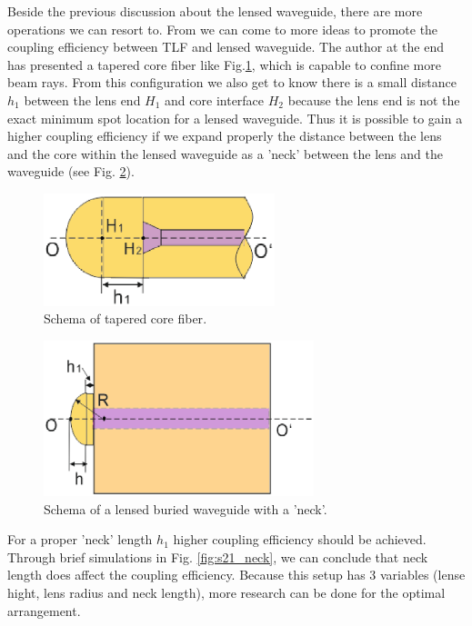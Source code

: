 Beside the previous discussion about the lensed waveguide, there are more operations we can resort to. From \cite{integrated_coupling_between_LD_SMF} we can come to more ideas to promote the coupling efficiency between TLF and lensed waveguide. The author at the end has presented a tapered core fiber like Fig.\ref{fig:tapered_core_fiber}, which is capable to confine more beam rays. From this configuration we also get to know there is a small distance $h_{1}$ between the lens end $H_{1}$ and core interface $H_{2}$ because the lens end is not the exact minimum spot location for a lensed waveguide. Thus it is possible to gain a higher coupling efficiency if we expand properly the distance between the lens and the core within the lensed waveguide as a 'neck' between the lens and the waveguide (see Fig. \ref{fig:lensed_waveguide_neck}).\\ 

\begin{figure}[!ht]
\centering
\includegraphics[width=0.6\textwidth]{bilder/tapered_core_fiber}
\caption {Schema of tapered core fiber\cite{integrated_coupling_between_LD_SMF}.}
\label{fig:tapered_core_fiber}
\end{figure}
\begin{figure}[!ht]
\centering
\includegraphics[width=0.7\textwidth]{bilder/lensed_waveguide_neck}
\caption {Schema of a lensed buried waveguide with a 'neck'.}
\label{fig:lensed_waveguide_neck}
\end{figure}
For a proper 'neck' length $h_{1}$ higher coupling efficiency should be achieved. Through brief simulations in Fig. \ref{fig:s21_neck}, we can conclude that neck length does affect the coupling efficiency. Because this setup has 3 variables (lense hight, lens radius and neck length), more research can be done for the optimal arrangement.\\

